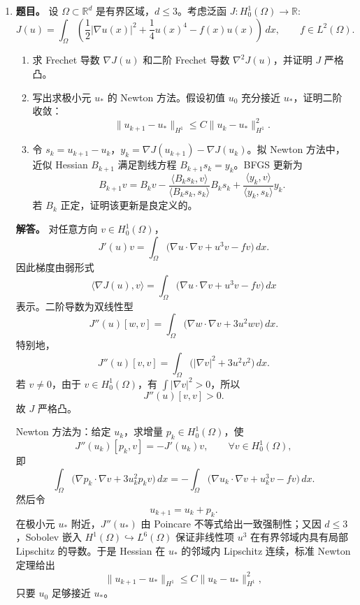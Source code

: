﻿\documentclass[UTF8,12pt]{ctexart}
\begin{document}
\begin{enumerate}[label=\textbf{\arabic*.},leftmargin=2.2em]
令
\[
M_{ij}=(\phi_j,\phi_i),\qquad
B_{ij}=(\phi_j',\phi_i),\qquad
K_{ij}=(\phi_j',\phi_i'),\qquad
F_i=(f,\phi_i).
\]
把 \(u_h^n=\sum_jU_j^n\phi_j\) 代入变分格式，得到
\[
\left(\frac{\alpha}{\tau}M+\beta B+\gamma K\right)U^n
=F+\frac{\alpha}{\tau}MU^{n-1}.
\]
这就是每一时间步要求解的代数系统。

\item \textbf{题目。} 设 \(\Omega\subset\mathbb R^d\) 是有界区域，\(d\le3\)。考虑泛函 \(J:H_0^1(\Omega)\to\mathbb R\):
\[
J(u)=\int_\Omega\left(\frac12|\nabla u(x)|^2+\frac14u(x)^4-f(x)u(x)\right)\,dx,
\qquad f\in L^2(\Omega).
\]
\begin{enumerate}[label=(\alph*),leftmargin=2.0em]
\item 求 Frechet 导数 \(\nabla J(u)\) 和二阶 Frechet 导数 \(\nabla^2J(u)\)，并证明 \(J\) 严格凸。
\item 写出求极小元 \(u_*\) 的 Newton 方法。假设初值 \(u_0\) 充分接近 \(u_*\)，证明二阶收敛：
\[
\|u_{k+1}-u_*\|_{H^1}\le C\|u_k-u_*\|_{H^1}^2.
\]
\item 令 \(s_k=u_{k+1}-u_k\)，\(y_k=\nabla J(u_{k+1})-\nabla J(u_k)\)。拟 Newton 方法中，近似 Hessian \(B_{k+1}\) 满足割线方程 \(B_{k+1}s_k=y_k\)。BFGS 更新为
\[
B_{k+1}v
=B_kv-\frac{\langle B_ks_k,v\rangle}{\langle B_ks_k,s_k\rangle}B_ks_k
+\frac{\langle y_k,v\rangle}{\langle y_k,s_k\rangle}y_k.
\]
若 \(B_k\) 正定，证明该更新是良定义的。
\end{enumerate}

\textbf{解答。} 对任意方向 \(v\in H_0^1(\Omega)\)，
\[
J'(u)v
=\int_\Omega\bigl(\nabla u\cdot\nabla v+u^3v-fv\bigr)\,dx.
\]
因此梯度由弱形式
\[
\langle \nabla J(u),v\rangle
=\int_\Omega\bigl(\nabla u\cdot\nabla v+u^3v-fv\bigr)\,dx
\]
表示。二阶导数为双线性型
\[
J''(u)[w,v]
=\int_\Omega\bigl(\nabla w\cdot\nabla v+3u^2wv\bigr)\,dx.
\]
特别地，
\[
J''(u)[v,v]
=\int_\Omega\bigl(|\nabla v|^2+3u^2v^2\bigr)\,dx.
\]
若 \(v\ne0\)，由于 \(v\in H_0^1(\Omega)\)，有 \(\int|\nabla v|^2>0\)，所以
\[
J''(u)[v,v]>0.
\]
故 \(J\) 严格凸。

Newton 方法为：给定 \(u_k\)，求增量 \(p_k\in H_0^1(\Omega)\)，使
\[
J''(u_k)[p_k,v]=-J'(u_k)v,\qquad \forall v\in H_0^1(\Omega),
\]
即
\[
\int_\Omega\bigl(\nabla p_k\cdot\nabla v+3u_k^2p_kv\bigr)\,dx
=-\int_\Omega\bigl(\nabla u_k\cdot\nabla v+u_k^3v-fv\bigr)\,dx.
\]
然后令
\[
u_{k+1}=u_k+p_k.
\]
在极小元 \(u_*\) 附近，\(J''(u_*)\) 由 Poincare 不等式给出一致强制性；又因 \(d\le3\)，Sobolev 嵌入 \(H^1(\Omega)\hookrightarrow L^6(\Omega)\) 保证非线性项 \(u^3\) 在有界邻域内具有局部 Lipschitz 的导数。于是 Hessian 在 \(u_*\) 的邻域内 Lipschitz 连续，标准 Newton 定理给出
\[
\|u_{k+1}-u_*\|_{H^1}
\le C\|u_k-u_*\|_{H^1}^2,
\]
只要 \(u_0\) 足够接近 \(u_*\)。


\end{enumerate}
\end{document}

